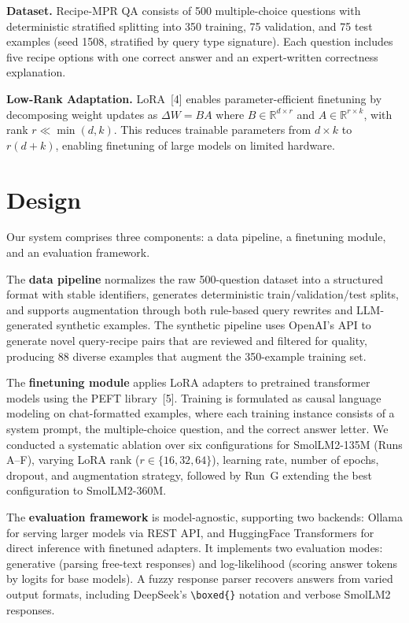 \documentclass{article}
\begin{document}
\textbf{Dataset.} Recipe-MPR QA consists of 500 multiple-choice questions with deterministic stratified splitting into 350 training, 75 validation, and 75 test examples (seed 1508, stratified by query type signature). Each question includes five recipe options with one correct answer and an expert-written correctness explanation.

\textbf{Low-Rank Adaptation.} LoRA~[4] enables parameter-efficient finetuning by decomposing weight updates as $\Delta W = BA$ where $B \in \mathbb{R}^{d \times r}$ and $A \in \mathbb{R}^{r \times k}$, with rank $r \ll \min(d, k)$. This reduces trainable parameters from $d \times k$ to $r(d + k)$, enabling finetuning of large models on limited hardware.

\section{Design}

Our system comprises three components: a data pipeline, a finetuning module, and an evaluation framework.

The \textbf{data pipeline} normalizes the raw 500-question dataset into a structured format with stable identifiers, generates deterministic train/validation/test splits, and supports augmentation through both rule-based query rewrites and LLM-generated synthetic examples. The synthetic pipeline uses OpenAI's API to generate novel query-recipe pairs that are reviewed and filtered for quality, producing 88 diverse examples that augment the 350-example training set.

The \textbf{finetuning module} applies LoRA adapters to pretrained transformer models using the PEFT library~[5]. Training is formulated as causal language modeling on chat-formatted examples, where each training instance consists of a system prompt, the multiple-choice question, and the correct answer letter. We conducted a systematic ablation over six configurations for SmolLM2-135M (Runs A--F), varying LoRA rank ($r \in \{16, 32, 64\}$), learning rate, number of epochs, dropout, and augmentation strategy, followed by Run~G extending the best configuration to SmolLM2-360M.

The \textbf{evaluation framework} is model-agnostic, supporting two backends: Ollama for serving larger models via REST API, and HuggingFace Transformers for direct inference with finetuned adapters. It implements two evaluation modes: generative (parsing free-text responses) and log-likelihood (scoring answer tokens by logits for base models). A fuzzy response parser recovers answers from varied output formats, including DeepSeek's \texttt{\textbackslash boxed\{\}} notation and verbose SmolLM2 responses.
\end{document}
